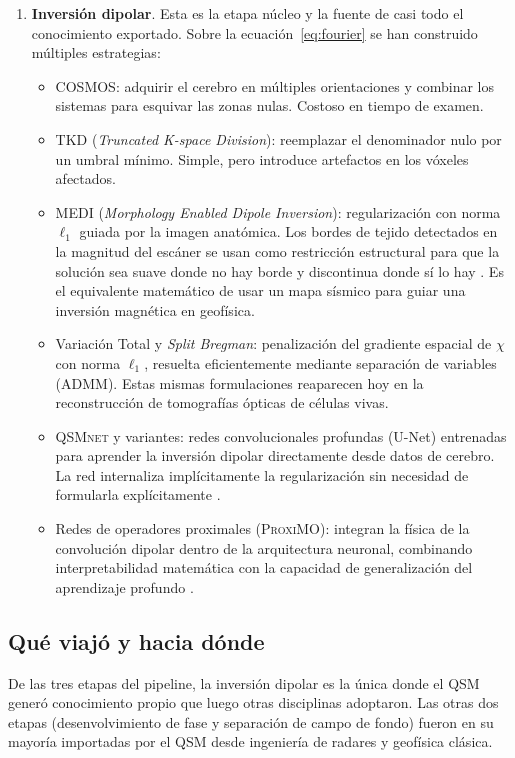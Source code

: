 \documentclass[12pt, a4paper]{article}
\begin{document}
\begin{enumerate}[leftmargin=2em, itemsep=3pt]
  \item \textbf{Inversión dipolar}. Esta es la etapa núcleo y la fuente de casi todo el conocimiento exportado. Sobre la ecuación~\eqref{eq:fourier} se han construido múltiples estrategias:
  \begin{itemize}[leftmargin=1.5em, itemsep=2pt]
    \item \textsc{COSMOS}: adquirir el cerebro en múltiples orientaciones y combinar los sistemas para esquivar las zonas nulas. Costoso en tiempo de examen.
    \item \textsc{TKD} (\emph{Truncated K-space Division}): reemplazar el denominador nulo por un umbral mínimo. Simple, pero introduce artefactos en los vóxeles afectados.
    \item \textsc{MEDI} (\emph{Morphology Enabled Dipole Inversion}): regularización con norma $\ell_1$ guiada por la imagen anatómica. Los bordes de tejido detectados en la magnitud del escáner se usan como restricción estructural para que la solución sea suave donde no hay borde y discontinua donde sí lo hay \cite{Liu2011MEDI}. Es el equivalente matemático de usar un mapa sísmico para guiar una inversión magnética en geofísica.
    \item Variación Total y \emph{Split Bregman}: penalización del gradiente espacial de $\chi$ con norma $\ell_1$, resuelta eficientemente mediante separación de variables (ADMM). Estas mismas formulaciones reaparecen hoy en la reconstrucción de tomografías ópticas de células vivas.
    \item \textsc{QSMnet} y variantes: redes convolucionales profundas (U-Net) entrenadas para aprender la inversión dipolar directamente desde datos de cerebro. La red internaliza implícitamente la regularización sin necesidad de formularla explícitamente \cite{Yoon2018QSMnet}.
    \item Redes de operadores proximales (\textsc{ProxiMO}): integran la física de la convolución dipolar dentro de la arquitectura neuronal, combinando interpretabilidad matemática con la capacidad de generalización del aprendizaje profundo \cite{Cai2021ProxiMO}.
  \end{itemize}

\end{enumerate}

\subsection*{Qué viajó y hacia dónde}

De las tres etapas del pipeline, la inversión dipolar es la única donde el QSM generó conocimiento propio que luego otras disciplinas adoptaron. Las otras dos etapas (desenvolvimiento de fase y separación de campo de fondo) fueron en su mayoría importadas por el QSM desde ingeniería de radares y geofísica clásica.
\end{document}

